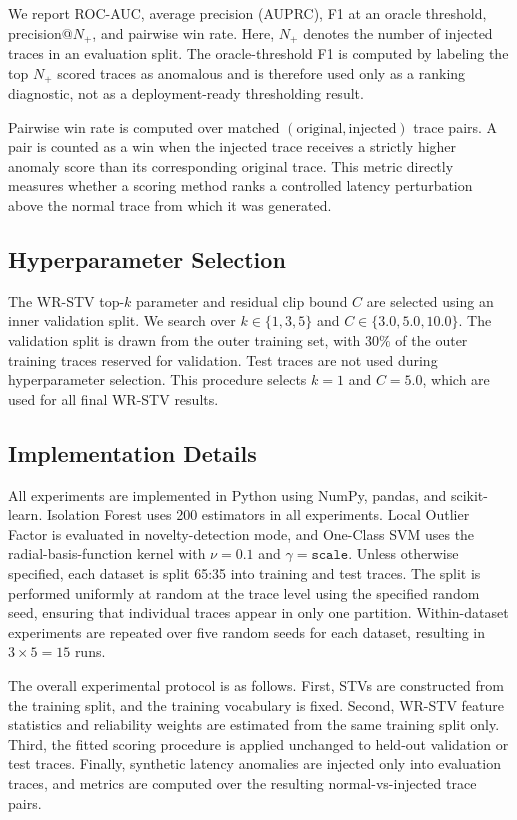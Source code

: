 We report ROC-AUC, average precision (AUPRC), F1 at an oracle threshold,
precision@\(N_+\), and pairwise win rate. Here, \(N_+\) denotes the
number of injected traces in an evaluation split. The oracle-threshold
F1 is computed by labeling the top \(N_+\) scored traces as anomalous and
is therefore used only as a ranking diagnostic, not as a deployment-ready
thresholding result.

Pairwise win rate is computed over matched
\((\text{original}, \text{injected})\) trace pairs. A pair is counted as a
win when the injected trace receives a strictly higher anomaly score than
its corresponding original trace. This metric directly measures whether
a scoring method ranks a controlled latency perturbation above the normal
trace from which it was generated.

\subsection{Hyperparameter Selection}
\label{sec:hyperparameter-selection}

The WR-STV top-\(k\) parameter and residual clip bound \(C\) are selected
using an inner validation split. We search over
\(k \in \{1,3,5\}\) and \(C \in \{3.0,5.0,10.0\}\). The validation split
is drawn from the outer training set, with \(30\%\) of the outer training
traces reserved for validation. Test traces are not used during
hyperparameter selection. This procedure selects \(k=1\) and \(C=5.0\),
which are used for all final WR-STV results.



\subsection{Implementation Details}

All experiments are implemented in Python using NumPy, pandas, and
scikit-learn. Isolation Forest uses 200 estimators in all experiments.
Local Outlier Factor is evaluated in novelty-detection mode, and
One-Class SVM uses the radial-basis-function kernel with
\(\nu=0.1\) and \(\gamma=\texttt{scale}\). Unless otherwise specified,
each dataset is split 65:35 into training and test traces. The split is performed uniformly at random at the trace level using the specified random seed, ensuring that individual traces appear in only one partition. Within-dataset
experiments are repeated over five random seeds for each dataset,
resulting in \(3 \times 5 = 15\) runs.

The overall experimental protocol is as follows. First, STVs are
constructed from the training split, and the training vocabulary is fixed.
Second, WR-STV feature statistics and reliability weights are estimated
from the same training split only. Third, the fitted scoring procedure is
applied unchanged to held-out validation or test traces. Finally,
synthetic latency anomalies are injected only into evaluation traces, and
metrics are computed over the resulting normal-vs-injected trace pairs.